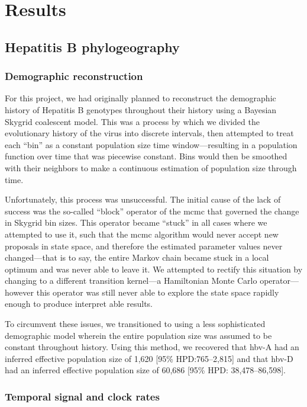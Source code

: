 \chapter{Results}\label{ch:results}

\section{Hepatitis B phylogeography}

\subsection{Demographic reconstruction}

For this project, we had originally planned to reconstruct the demographic history of Hepatitis B genotypes throughout their history using a Bayesian Skygrid coalescent model.
This was a process by which we divided the evolutionary history of the virus into discrete intervals, then attempted to treat each ``bin'' as a constant population size time window---resulting in a population function over time that was piecewise constant.
Bins would then be smoothed with their neighbors to make a continuous estimation of population size through time.

Unfortunately, this process was unsuccessful.
The initial cause of the lack of success was the so-called ``block'' operator of the \gls{mcmc} that governed the change in Skygrid bin sizes.
This operator became ``stuck'' in all cases where we attempted to use it, such that the \gls{mcmc} algorithm would never accept new proposals in state space, and therefore the estimated parameter values never changed---that is to say, the entire Markov chain became stuck in a local optimum and was never able to leave it.
We attempted to rectify this situation by changing to a different transition kernel---a Hamiltonian Monte Carlo operator---however this operator was still never able to explore the state space rapidly enough to produce interpret able results.

To circumvent these issues, we transitioned to using a less sophisticated demographic model wherein the entire population size was assumed to be constant throughout history.
Using this method, we recovered that \gls{hbv}-A had an inferred effective population size of 1,620 [95\% HPD:765--2,815] and that \gls{hbv}-D had an inferred effective population size of 60,686 [95\% HPD: 38,478--86,598].

\subsection{Temporal signal and clock rates}

